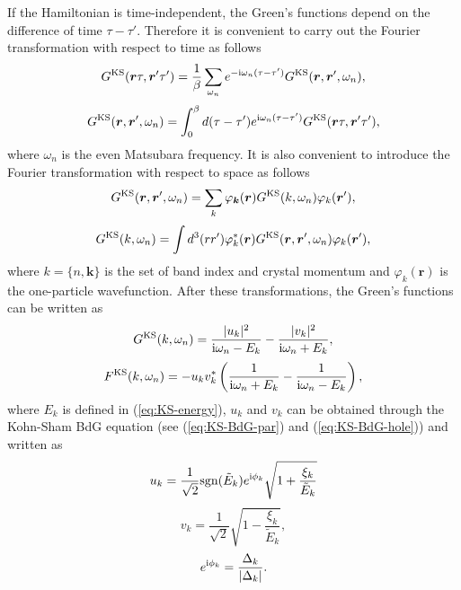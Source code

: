 If the Hamiltonian is time-independent, the
Green's functions depend on the difference of time $\tau - \tau'$. Therefore it is convenient
to carry out the Fourier transformation with respect to time as follows
%
\begin{equation}
	G^{\rm KS}(\bm r \tau, \bm r' \tau') = \frac{1}{\beta} \sum_{\omega_n}
	e^{-{\rm i}\omega_n(\tau-\tau')} G^{\rm KS}(\bm r,\bm r', \omega_n),
	\label{eq:GFourier1}
\end{equation}
%
\begin{equation}
	G^{\rm KS}(\bm r, \bm r', \omega_n) = \int_{0}^{\beta} d(\tau-\tau')
	e^{{\rm i}\omega_n(\tau-\tau')} G^{\rm KS}(\bm r \tau,\bm r' \tau'),
	\label{eq:GFourier2}
\end{equation}
%
where $\omega_n$ is the even Matsubara frequency. It is also convenient to introduce the Fourier
transformation with respect to space as follows
%
\begin{equation}
	G^{\rm KS}(\bm r, \bm r', \omega_n) = \sum_{ k}\varphi_{\bm k}(\bm r)
	G^{\rm KS}( k, \omega_n)\varphi_{ k}(\bm r'),
\label{eq:GFourier3}
\end{equation}
%
\begin{equation}
	G^{\rm KS}( k, \omega_n) = \int d^3(rr') \varphi^{\ast}_{ k}(\bm r)
	G^{\rm KS}(\bm r,\bm r', \omega_n)
	\varphi_{ k}(\bm r'),
	\label{eq:GFourier4}
\end{equation}
%
where $k=\{ n, \bm k \}$ is the set of band index and crystal momentum and 
$\varphi_{ k}(\bm r)$ is the one-particle wavefunction. After these transformations,
the Green's functions can be written as
%
\begin{equation}
	G^{\rm KS}( k, \omega_n) = \frac{|u_{ k}|^2}{ {\rm i}\omega_n - E_{ k}}
	- \frac{|v_{ k}|^2}{ {\rm i}\omega_n + E_{ k}},
	\label{eq:Gkomega}
\end{equation}
%
\begin{equation}
	F^{\rm KS}( k, \omega_n) = - u_{ k}v_{ k}^{\ast} \left( 
	\frac{1}{ {\rm i}\omega_n + E_{ k}} -\frac{1}{ {\rm i}\omega_n - E_{ k}}
	\right),
	\label{eq:Fkomega}
\end{equation}
%
where $E_{ k} $ is defined in (\ref{eq:KS-energy}), $u_{ k}$ and $v_{ k}$ can be obtained
through the Kohn-Sham BdG equation (see (\ref{eq:KS-BdG-par}) and (\ref{eq:KS-BdG-hole})) 
and written as
%
\begin{equation}
	u_{ k} = \frac{1}{\sqrt{2}} {\rm sgn}(\tilde{E}_{ k})e^{ {\rm i}\phi_{ k}}
	\sqrt{1 + \frac{\xi_{ k}}{\tilde{E}_{ k}}}
	\label{eq:uk}
\end{equation}
%
\begin{equation}
	v_{ k} = \frac{1}{\sqrt{2}} \sqrt{1 - \frac{\xi_{ k}}{\tilde{E}_{ k}}},
	\label{eq:vk}
\end{equation}
%
\begin{equation}
	e^{ {\rm i}\phi_{ k}} = \frac{\Delta_{ k}}{|\Delta_{ k}|}.
	\label{eq:phase}
\end{equation}
%

